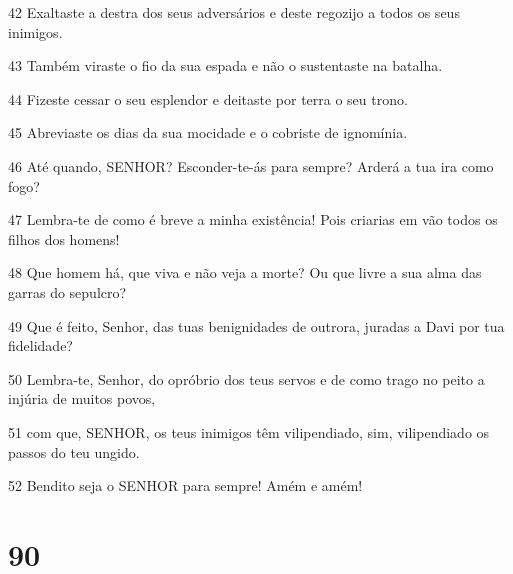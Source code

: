 \par 42 Exaltaste a destra dos seus adversários e deste regozijo a todos os seus inimigos.
\par 43 Também viraste o fio da sua espada e não o sustentaste na batalha.
\par 44 Fizeste cessar o seu esplendor e deitaste por terra o seu trono.
\par 45 Abreviaste os dias da sua mocidade e o cobriste de ignomínia.
\par 46 Até quando, SENHOR? Esconder-te-ás para sempre? Arderá a tua ira como fogo?
\par 47 Lembra-te de como é breve a minha existência! Pois criarias em vão todos os filhos dos homens!
\par 48 Que homem há, que viva e não veja a morte? Ou que livre a sua alma das garras do sepulcro?
\par 49 Que é feito, Senhor, das tuas benignidades de outrora, juradas a Davi por tua fidelidade?
\par 50 Lembra-te, Senhor, do opróbrio dos teus servos e de como trago no peito a injúria de muitos povos,
\par 51 com que, SENHOR, os teus inimigos têm vilipendiado, sim, vilipendiado os passos do teu ungido.
\par 52 Bendito seja o SENHOR para sempre! Amém e amém!

\chapter{90}

